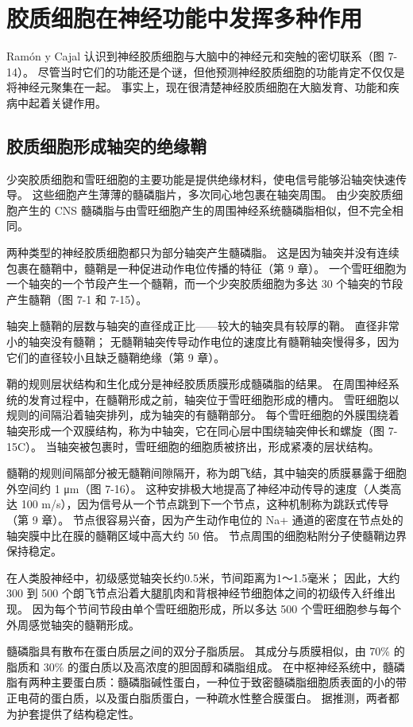 \section{胶质细胞在神经功能中发挥多种作用}
Ramón y Cajal 认识到神经胶质细胞与大脑中的神经元和突触的密切联系（图 7-14）。 尽管当时它们的功能还是个谜，但他预测神经胶质细胞的功能肯定不仅仅是将神经元聚集在一起。 事实上，现在很清楚神经胶质细胞在大脑发育、功能和疾病中起着关键作用。

\subsection{胶质细胞形成轴突的绝缘鞘}
少突胶质细胞和雪旺细胞的主要功能是提供绝缘材料，使电信号能够沿轴突快速传导。 这些细胞产生薄薄的髓磷脂片，多次同心地包裹在轴突周围。 由少突胶质细胞产生的 CNS 髓磷脂与由雪旺细胞产生的周围神经系统髓磷脂相似，但不完全相同。

两种类型的神经胶质细胞都只为部分轴突产生髓磷脂。 这是因为轴突并没有连续包裹在髓鞘中，髓鞘是一种促进动作电位传播的特征（第 9 章）。 一个雪旺细胞为一个轴突的一个节段产生一个髓鞘，而一个少突胶质细胞为多达 30 个轴突的节段产生髓鞘（图 7-1 和 7-15）。

轴突上髓鞘的层数与轴突的直径成正比——较大的轴突具有较厚的鞘。 直径非常小的轴突没有髓鞘； 无髓鞘轴突传导动作电位的速度比有髓鞘轴突慢得多，因为它们的直径较小且缺乏髓鞘绝缘（第 9 章）。

鞘的规则层状结构和生化成分是神经胶质质膜形成髓磷脂的结果。 在周围神经系统的发育过程中，在髓鞘形成之前，轴突位于雪旺细胞形成的槽内。 雪旺细胞以规则的间隔沿着轴突排列，成为轴突的有髓鞘部分。 每个雪旺细胞的外膜围绕着轴突形成一个双膜结构，称为中轴突，它在同心层中围绕轴突伸长和螺旋（图 7-15C）。 当轴突被包裹时，雪旺细胞的细胞质被挤出，形成紧凑的层状结构。

髓鞘的规则间隔部分被无髓鞘间隙隔开，称为朗飞结，其中轴突的质膜暴露于细胞外空间约 1 μm（图 7-16）。 这种安排极大地提高了神经冲动传导的速度（人类高达 100 m/s），因为信号从一个节点跳到下一个节点，这种机制称为跳跃式传导（第 9 章）。 节点很容易兴奋，因为产生动作电位的 Na+ 通道的密度在节点处的轴突膜中比在膜的髓鞘区域中高大约 50 倍。 节点周围的细胞粘附分子使髓鞘边界保持稳定。

在人类股神经中，初级感觉轴突长约0.5米，节间距离为1～1.5毫米； 因此，大约 300 到 500 个朗飞节点沿着大腿肌肉和背根神经节细胞体之间的初级传入纤维出现。 因为每个节间节段由单个雪旺细胞形成，所以多达 500 个雪旺细胞参与每个外周感觉轴突的髓鞘形成。

髓磷脂具有散布在蛋白质层之间的双分子脂质层。 其成分与质膜相似，由 70\% 的脂质和 30\% 的蛋白质以及高浓度的胆固醇和磷脂组成。 在中枢神经系统中，髓磷脂有两种主要蛋白质：髓磷脂碱性蛋白，一种位于致密髓磷脂细胞质表面的小的带正电荷的蛋白质，以及蛋白脂质蛋白，一种疏水性整合膜蛋白。 据推测，两者都为护套提供了结构稳定性。

